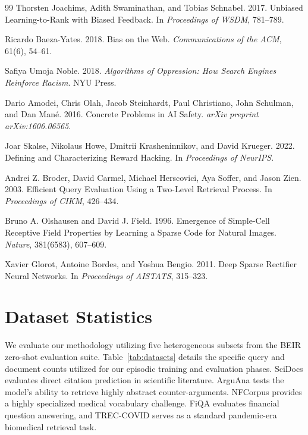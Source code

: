 \documentclass[sigconf]{acmart}
\begin{document}
\begin{thebibliography}{99}
Thorsten Joachims, Adith Swaminathan, and Tobias Schnabel. 2017. Unbiased Learning-to-Rank with Biased Feedback. In \textit{Proceedings of WSDM}, 781--789.

Ricardo Baeza-Yates. 2018. Bias on the Web. \textit{Communications of the ACM}, 61(6), 54--61.

Safiya Umoja Noble. 2018. \textit{Algorithms of Oppression: How Search Engines Reinforce Racism}. NYU Press.

Dario Amodei, Chris Olah, Jacob Steinhardt, Paul Christiano, John Schulman, and Dan Man\'e. 2016. Concrete Problems in AI Safety. \textit{arXiv preprint arXiv:1606.06565}.

Joar Skalse, Nikolaus Howe, Dmitrii Krasheninnikov, and David Krueger. 2022. Defining and Characterizing Reward Hacking. In \textit{Proceedings of NeurIPS}.

Andrei Z. Broder, David Carmel, Michael Herscovici, Aya Soffer, and Jason Zien. 2003. Efficient Query Evaluation Using a Two-Level Retrieval Process. In \textit{Proceedings of CIKM}, 426--434.

Bruno A. Olshausen and David J. Field. 1996. Emergence of Simple-Cell Receptive Field Properties by Learning a Sparse Code for Natural Images. \textit{Nature}, 381(6583), 607--609.

Xavier Glorot, Antoine Bordes, and Yoshua Bengio. 2011. Deep Sparse Rectifier Neural Networks. In \textit{Proceedings of AISTATS}, 315--323.

\end{thebibliography}

\appendix

\section{Dataset Statistics}

We evaluate our methodology utilizing five heterogeneous subsets from the BEIR zero-shot evaluation suite. Table~\ref{tab:datasets} details the specific query and document counts utilized for our episodic training and evaluation phases. SciDocs evaluates direct citation prediction in scientific literature. ArguAna tests the model's ability to retrieve highly abstract counter-arguments. NFCorpus provides a highly specialized medical vocabulary challenge. FiQA evaluates financial question answering, and TREC-COVID serves as a standard pandemic-era biomedical retrieval task.
\end{document}

